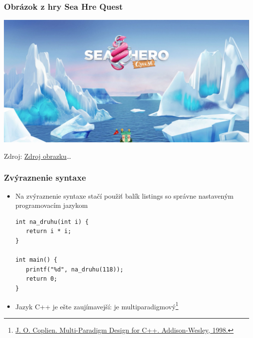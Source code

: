 \documentclass{beamer}
\newcommand{\footcite}[1]{\footnote{\tiny #1}}
\begin{document}
\begin{frame}[fragile=singleslide]\frametitle{Obrázok z hry Sea Hre Quest}
\includegraphics[scale=.10]{SeaHeroQuest.jpg}

{\tiny Zdroj: \href{https://www.google.com/url?sa=i&url=https\%3A\%2F\%2Fwww.telekom.com\%2Fen\%2Fcorporate-responsibility\%2Fcorporate-responsibility\%2Fsea-hero-quest-game-for-good-587134&psig=AOvVaw203PQbtLG9cIHlo15vkbQX&ust=1668016041500000&source=images&cd=vfe&ved=0CA0QjRxqFwoTCIjom4-Sn_sCFQAAAAAdAAAAABAE}{Zdroj obrazku}\ldots}
\end{frame}


\begin{frame}[fragile=singleslide]\frametitle{Zvýraznenie syntaxe}
\begin{itemize}
\item Na zvýraznenie syntaxe stačí použiť balík listings so správne nastaveným programovacím jazykom
\begin{lstlisting}
int na_druhu(int i) {
   return i * i;
}

int main() {
   printf("%d", na_druhu(118));
   return 0;
}
\end{lstlisting}

\item Jazyk C++ je ešte zaujímavejší: je multiparadigmový\footcite{\url{J. O. Coplien. Multi-Paradigm Design for C++. Addison-Wesley, 1998.}}
\end{itemize}
\end{frame}
\end{document}
